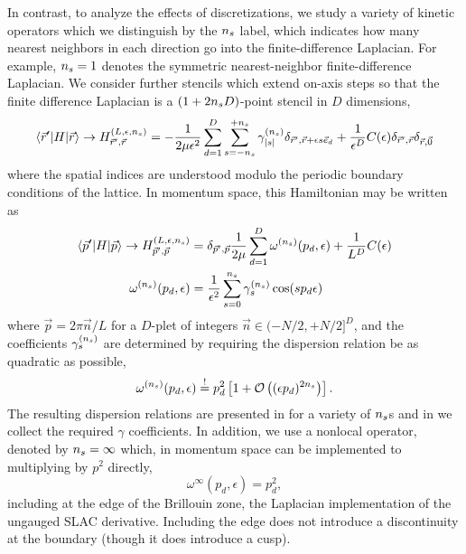In contrast, to analyze the effects of discretizations, we study a variety of kinetic operators which we distinguish by the ${n_s}$ label, which indicates how many nearest neighbors in each direction go into the finite-difference Laplacian.
For example, ${n_s}=1$ denotes the symmetric nearest-neighbor finite-difference Laplacian.
We consider further stencils which extend on-axis steps so that the finite difference Laplacian is a $(1+2{n_s} D)$-point stencil in $D$ dimensions,
\begin{equation}
    \left\langle \vec{r}' \middle| H \middle| \vec{r} \right\rangle
    \rightarrow
    H_{\vec{r}',\vec{r}}^{(L,\epsilon,{n_s})}
    =
    - \frac{1}{2 \mu \epsilon^2}
        \sum_{d=1}^{D} \sum_{s=-{n_s}}^{+{n_s}}
            \gamma^{({n_s})}_{|s|} \delta_{\vec{r}',\vec{r}+\epsilon s \vec{e}_d}
    + \frac{1}{\epsilon^D}C(\epsilon) \delta_{\vec{r}',\vec{r}}\delta_{\vec{r},\vec{0}}
\end{equation}
where the spatial indices are understood modulo the periodic boundary conditions of the lattice.
In momentum space, this Hamiltonian may be written as
\begin{align}
    \label{eq:p space hamiltonian}
    \left\langle \vec{p}' \middle| H \middle| \vec{p} \right\rangle
    \rightarrow
    H_{\vec{p}',\vec{p}}^{(L,\epsilon,{n_s})}
    &=
    \delta_{\vec{p}',\vec{p}} \frac{1}{2\mu} \sum_{d=1}^{D} \omega^{({n_s})}(p_d,\epsilon)
    +\frac{1}{L^D}C(\epsilon)
    \\
    \label{eq:gamma definition}
    \omega^{({n_s})}(p_d,\epsilon)
    &= \frac{1}{\epsilon^2} \sum_{s=0}^{{n_s}} \gamma_{s}^{({n_s})} \cos(s p_d \epsilon)
\end{align}
where $\vec{p} = 2\pi \vec{n}/L$ for a $D$-plet of integers $\vec{n} \in (-N/2, +N/2]^D$, and the coefficients $\gamma_{s}^{({n_s})}$ are determined by requiring the dispersion relation be as quadratic as possible,
\begin{equation}
    \label{eq:gamma determination}
    \omega^{({n_s})}(p_d,\epsilon) \overset{!}{=} p_d^2 \left[ 1 + \mathcal{O}\left((\epsilon p_d)^{2{n_s}}\right)\right].
\end{equation}
The resulting dispersion relations are presented in  for a variety of ${n_s}$s and
in  we collect the required $\gamma$ coefficients.
In addition, we use a nonlocal operator, denoted by ${n_s}=\infty$ which, in momentum space can be implemented to multiplying by $p^2$ directly,
\begin{equation}
    \omega^{\infty}(p_d,\epsilon) = p_d^2,
\end{equation}
including at the edge of the Brillouin zone, the Laplacian implementation of the ungauged SLAC derivative.
Including the edge does not introduce a discontinuity at the boundary (though it does introduce a cusp).

